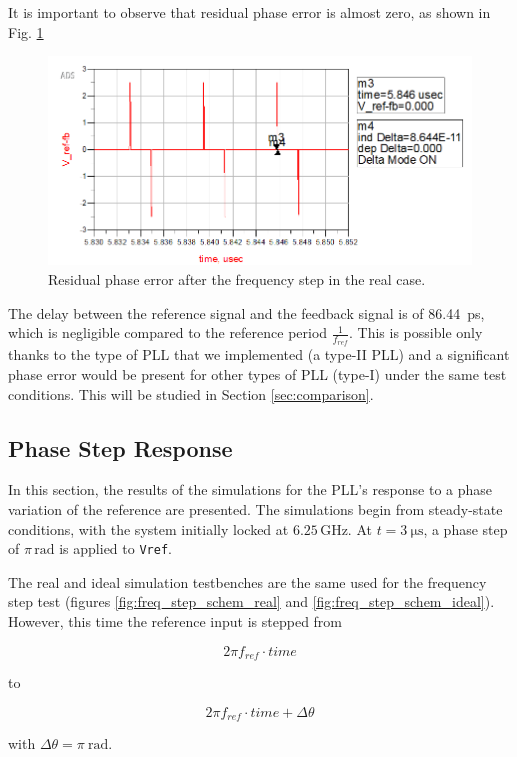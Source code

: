 \documentclass[lettersize,journal]{IEEEtran}
\begin{document}
It is important to observe that residual phase error is almost zero, as shown in Fig. \ref{fig:phase_error_real}

\begin{figure}[!h]
    \centering
    \includegraphics[width=0.5\linewidth]{images/ads_results/freq_step/phase_error_real.png}
    \caption{Residual phase error after the frequency step in the real case.}
    \label{fig:phase_error_real}
\end{figure}

The delay between the reference signal and the feedback signal is of \qty{86.44}{\pico\second}, which is negligible compared to the reference period $\frac{1}{f_{ref}}$. This is possible only thanks to the type of PLL that we implemented (a type-II PLL) and a significant phase error would be present for other types of PLL (type-I) under the same test conditions. This will be studied in Section \ref{sec:comparison}.

\subsection{Phase Step Response}\label{ssec:phase_step}
In this section, the results of the simulations for the PLL’s response to a phase variation of the reference are presented. The simulations begin from steady-state conditions, with the system initially locked at \(6.25 \, \text{GHz}\). At \(t=\SI{3}{\micro\second}\), a phase step of \(\pi \, \text{rad}\) is applied to \texttt{Vref}.

The real and ideal simulation testbenches are the same used for the frequency step test (figures \ref{fig:freq_step_schem_real} and \ref{fig:freq_step_schem_ideal}). However, this time the reference input is stepped from

\[2\pi f_{ref}\cdot time\]

to

\[2\pi f_{ref}\cdot time+\Delta\theta\]

with $\Delta\theta=\pi\ \text{rad}$.
\end{document}
